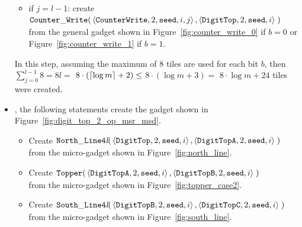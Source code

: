 \begin{itemize}
\begin{itemize}
        \item if $j = l-1$: create
        $\begin{aligned}[t]
            \cwrite(&\left\langle {\tt CounterWrite}, 2, {\tt seed}, i, j \right\rangle, \left\langle {\tt DigitTop}, 2, {\tt seed}, i \right\rangle \;)
        \end{aligned}$\\from the general gadget shown in Figure~\ref{fig:counter_write_0} if $b = 0$ or Figure~\ref{fig:counter_write_1} if $b = 1$.
    \end{itemize}
    In this step, assuming the maximum of 8 tiles are used for each bit $b$, then
    $\sum^{l-1}_{j=0} 8 = 8l =$
    $8 \cdot \left( \ceil*{\log m} + 2 \right) \leq$
    $8 \cdot \left( {\log m} + 3 \right) =$
    $8 \cdot {\log m} + 24$ tiles were created.

    \item {\dtop}, the following statements create the gadget shown in Figure~\ref{fig:digit_top_2_op_msr_msd}.
    \begin{itemize}
        \item Create
        $\begin{aligned}[t]
            {\tt North\_Line4\textit{l}}(& \left\langle {\tt DigitTop},  2, {\tt seed}, i \right\rangle,
                                           \left\langle {\tt DigitTopA}, 2, {\tt seed}, i \right\rangle\;)
        \end{aligned}$\\ from the micro-gadget shown in Figure~\ref{fig:north_line}.

        \item Create
        $\begin{aligned}[t]
            {\tt Topper}(& \left\langle {\tt DigitTopA}, 2, {\tt seed}, i \right\rangle,
                           \left\langle {\tt DigitTopB}, 2, {\tt seed}, i \right\rangle \;)
        \end{aligned}$\\from the micro-gadget shown in Figure~\ref{fig:topper_case2}.

        \item Create
        $\begin{aligned}[t]
            {\tt South\_Line4\textit{l}}(& \left\langle {\tt DigitTopB}, 2, {\tt seed}, i \right\rangle,
                                           \left\langle {\tt DigitTopC}, 2, {\tt seed}, i \right\rangle \;)
        \end{aligned}$\\from the micro-gadget shown in Figure~\ref{fig:south_line}.


\end{itemize}
\end{itemize}
